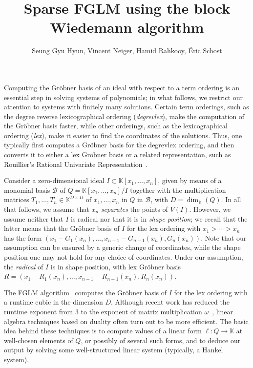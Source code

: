 \documentclass[12pt]{article}
\title{Sparse FGLM using the block Wiedemann algorithm}
\author{Seung Gyu Hyun, Vincent Neiger, Hamid Rahkooy, \' Eric Schost}
\begin{document}
\maketitle

Computing the Gr\"obner basis of an ideal with respect to a term
ordering is an essential step in solving systems of polynomials; in
what follows, we restrict our attention to systems with finitely many
solutions. Certain term orderings, such as the degree reverse
lexicographical ordering (\emph{degrevlex}), make the computation of the
Gr\"obner basis faster, while other orderings, such as the
lexicographical ordering (\emph{lex}), make it easier to find the coordinates
of the solutions. Thus, one typically first computes a Gr\"obner basis
for the degrevlex ordering, and then converts it to either a lex Gr\"obner
basis or a related representation, such as Rouillier's Rational
Univariate Representation~\cite{Rouillier99}.

Consider a zero-dimensional ideal $I \subset \mathbb{K}[x_1, \dots,
  x_n]$, given by means of a monomial basis $\mathscr{B}$ of
$Q=\mathbb{K}[x_1, \dots, x_n]/I$ together with the multiplication
matrices $T_1,\dots, T_n \in \mathbb{K}^{D \times D}$ of
$x_1,\dots,x_n$ in $Q$ in $\mathscr{B}$, with
$D=\dim_\mathbb{K}(Q)$. In all that follows, we assume that $x_n$ {\em
  separates} the points of $V(I)$. However, we assume neither that $I$
is radical nor that it is in {\em shape position}; we recall that the latter means that the
Gr\"obner basis of $I$ for the lex ordering with $x_1 > \cdots > x_n$ has the form
$(x_1-G_1(x_n),\dots,x_{n-1}-G_{n-1}(x_n),G_n(x_n))$. Note that our
assumption can be ensured by a generic change of coordinates, while
the shape position one may not hold for any choice of
coordinates. Under our assumption, the {\em radical} of $I$ is in
shape position, with lex Gr\"obner basis
$R=(x_1-R_1(x_n),\dots,x_{n-1}-R_{n-1}(x_n),R_n(x_n))$.

The FGLM algorithm~\cite{FaGiLaMo93} computes the Gr\"obner basis of
$I$ for the lex ordering with a runtime cubic in the dimension
$D$. Although recent work has reduced the runtime exponent from $3$ to
the exponent of matrix multiplication
$\omega$~\cite{FaGaHuRe13,Neiger16}, linear algebra techniques based
on duality often turn out to be more efficient. The basic idea behind
these techniques is to compute values of a
linear form $\ell: Q \to \mathbb{K}$ at well-chosen elements of $Q$,
or possibly of several such forms,
and to deduce our output by solving some well-structured linear system
(typically, a Hankel system).
\end{document}
